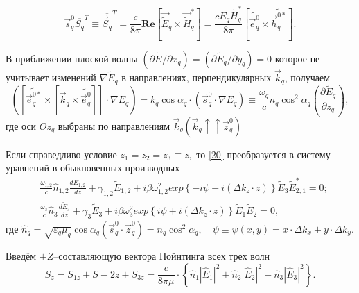 \documentclass[a4paper]{article}
\begin{document}
 	$$\vec{s}_{q}^{0}\overline{S_{q}}^{T}\equiv\overline{\vec{S}_{q}}^{T}=\frac{c}{8\pi}\textbf{Re}\left[\vec{\tilde{E}}_{q}\times\vec{\tilde{H}}_{q}^{*}\right]=\frac{c\tilde{E}_{q}\tilde{H}_{q}^{*}}{8\pi}\left[\tilde{\vec{e}^{0}_{q}}\times\tilde{\vec{h}^{0*}_{q}}\right].$$
 	
 	В приближении плоской волны $(\partial\tilde{E}_{}/\partial x_{q})=(\partial\tilde{E}_{q}/\partial y_{q})=0$ которое не учитывает изменений $\nabla\tilde{E}_{q}$ в направлениях, перпендикулярных $\vec{k}_{q}$, получаем 
 	$$\left(\left[\tilde{\vec{e}^{0*}_{q}}\times\left[\vec{k}_{q}\times\tilde{\vec{e}^{0}_{q}}\right]\right]\cdot\nabla\tilde{E}_{q}\right)=k_{q}\cos\alpha_{q}\cdot\left(\vec{s}_{q}^{0}\cdot\nabla\tilde{E}_{q}\right)\equiv\frac{\omega_{q}}{c}n_{q}\cos^{2}\alpha_{q}\left(\frac{\partial\tilde{E}_{q}}{\partial z_{q}}\right),$$
 	где оси $Oz_{q}$  выбраны по направлениям $\vec{k}_{q}\left(\vec{k}_{q}\uparrow\uparrow\vec{z}_{q}^{0}\right)$
 	
 	Если справедливо условие $z_{1}=z_{2}=z_{3}\equiv z,$ то \eqref{20} преобразуется в систему уравнений в обыкновенных производных
 	\begin{equation} 	
 		\begin{aligned}
 			&\frac{\omega_{1,2}}{c}\hat{n}_{1,2}\frac{d\tilde{E}_{1,2}}{dz}+\bar{\gamma}_{1,2}\tilde{E}_{1,2}+i\beta\omega_{1,2}^{2}exp\left\{-i\psi-i\left(\Delta k_{z}\cdot z\right)\right\}\tilde{E}_{3}\tilde{E}_{2,1}^{*}=0;\\
 			&\frac{\omega_{3}}{c}\hat{n}_{3}\frac{d\tilde{E}_{3}}{dz}+\bar{\gamma}_{3}\tilde{E}_{3}+i\beta\omega_{3}^{2}exp\left\{i\psi+i\left(\Delta k_{z}\cdot z\right)\right\}\tilde{E}_{1}\tilde{E}_{2}=0,
 		\end{aligned}\tag{20'''}\label{20'''}
 	\end{equation}
 	где $\hat{n}_{q}=\sqrt{\varepsilon_{q}\mu_{q}}\cos\alpha_{q}\left(\vec{s}_{q}^{0}\cdot\vec{z}_{q}^{0}\right)=n_{q}\cos^{2}\alpha_{q},\quad\psi\equiv\psi(x,y)=x\cdot\Delta k_{x}+y\cdot\Delta k_{y}.$
 	
 	Введём $+Z$–составляющую вектора Пойнтинга всех трех волн 
 	$$S_{z}=S_{1z}+S-{2z}+S_{3z}=\frac{c}{8\pi\mu}\cdot\left\{\hat{n}_{1}\left|\hat{E}_{1}\right|^{2}+\hat{n}_{2}\left|\hat{E}_{2}\right|^{2}+\hat{n}_{3}\left|\hat{E}_{3}\right|^{2}\right\}.$$
 
\end{document}
